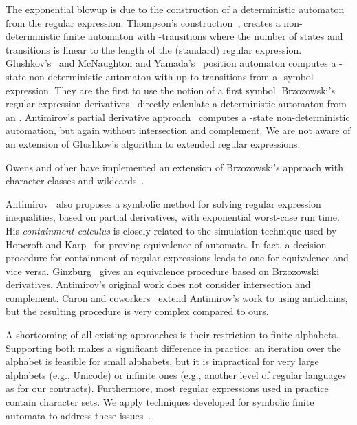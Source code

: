 The exponential blowup is due to the construction of a deterministic
automaton from the regular expression.
Thompson's construction~\cite{Thompson1968}, creates a
non-deterministic finite automaton with -transitions
where the number of states and transitions is linear to the length of
the (standard) regular expression.
Glushkov's~\cite{Glushkov1961} and McNaughton and
Yamada's~\cite{McNaughtonYamada1960} position automaton computes a
-state non-deterministic automaton with up to  transitions from a -symbol expression. They are the first to
use the notion of a first symbol.
Brzozowski's regular expression derivatives~\cite{Brzozowski1964} directly calculate a deterministic
automaton from an \ERE. Antimirov's partial derivative approach~\cite{Antimirov1996} computes a -state 
non-deterministic automation, but again without intersection and complement. 
We are not aware of an extension of Glushkov's algorithm to extended regular expressions. 

Owens and other have implemented an extension of Brzozowski's approach with character classes and
wildcards~\cite{OwensReppyTuron2009}. 

Antimirov~\cite{Antimirov1995} also proposes a symbolic method for solving regular expression inequalities, based on
partial derivatives, with exponential worst-case run time. His 
\emph{containment calculus} is closely related to the simulation technique used by Hopcroft and Karp~\cite{HopcroftKarp1971} for proving
equivalence of automata. In fact, a decision procedure for containment of regular expressions leads to one for
equivalence and vice versa.
Ginzburg~\cite{Ginzburg1967} gives an equivalence procedure based on
Brzozowski derivatives.
Antimirov's original work does not consider
intersection and complement. Caron and
coworkers~\cite{CaronChamparnaudMignot2011} extend Antimirov's work to
\ERE{} using antichains, but the resulting procedure is very complex compared to ours. 

A shortcoming of all existing approaches is their restriction to
finite alphabets. Supporting both
makes a significant difference in practice: an iteration over the
alphabet  is feasible for small alphabets, but it is
impractical for very large alphabets (e.g., Unicode) or infinite ones
(e.g., another level of regular languages as for our
contracts). Furthermore, most regular expressions used in practice
contain character sets. We apply techniques developed for symbolic
finite automata to address these issues~\cite{Veanes2013}.

